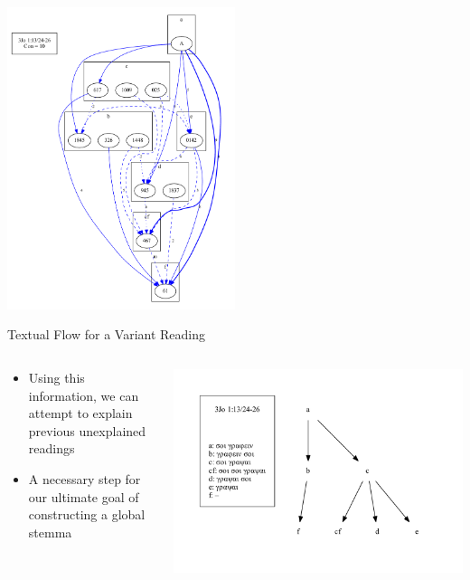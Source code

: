 \documentclass[10pt]{beamer}
\begin{document}
	\begin{frame}
		\begin{center}
			\includegraphics[width=0.5\textwidth]{../img/B25K1V13U24-26-coherence-variants-strengths.pdf}
		\end{center}
	\end{frame}
	\begin{frame}{Textual Flow for a Variant Reading}
		\begin{columns}
			\begin{column}{0.45\textwidth}
				\begin{itemize}
					\item Using this information, we can attempt to explain previous unexplained readings
					\item A necessary step for our ultimate goal of constructing a global stemma
				\end{itemize}
			\end{column}
			\begin{column}{0.45\textwidth}
				\begin{center}
					\includegraphics[width=\textwidth]{../img/B25K1V13U24-26-local-stemma-complete.pdf}
				\end{center}
			\end{column}
		\end{columns}
	\end{frame}
\end{document}
